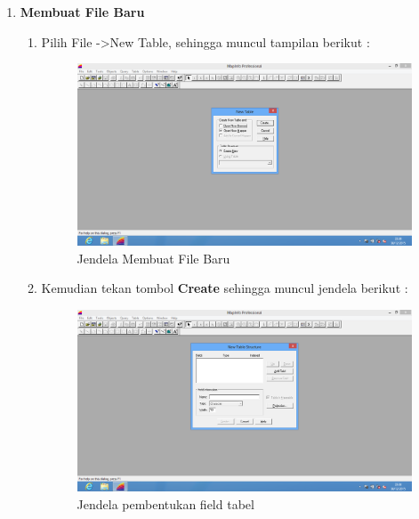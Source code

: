 \begin{enumerate}[\bfseries A.]
\begin{enumerate}[1.]
  \end{enumerate}
  
  \item \textbf{Membuat File Baru}
  
  \begin{enumerate}[1.]
  
    \item Pilih File -\textgreater New Table, sehingga muncul tampilan berikut :
    
    \begin{figure}[H]
      \centering
      \includegraphics[width=1\textwidth]{./resources/002-new-mapper}
      \caption{Jendela Membuat File Baru}
    \end{figure}
    
    \item Kemudian tekan tombol \textbf{Create} sehingga muncul jendela berikut :
    
    \begin{figure}[H]
      \centering
	  \includegraphics[width=1\textwidth]{./resources/003-pembentukan-tabel}
	  \caption{Jendela pembentukan field tabel}
	\end{figure}
    

\end{enumerate}
\end{enumerate}
